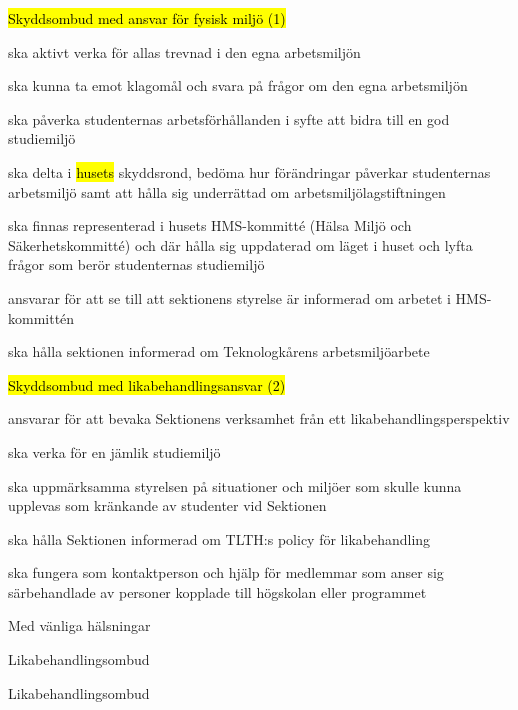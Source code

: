 \documentclass[../_main/handlingar.tex]{subfiles}
\begin{document}
\begin{attsatser}
  \hl{Skyddsombud med ansvar för fysisk miljö (1)}
  \begin{tightdashlist}
      \item ska aktivt verka för allas trevnad i den egna arbetsmiljön
      \item ska kunna ta emot klagomål och svara på frågor om den egna arbetsmiljön
      \item ska påverka studenternas arbetsförhållanden i syfte att bidra till en god studiemiljö
      \item ska delta i \hl{husets} skyddsrond, bedöma hur förändringar påverkar studenternas arbetsmiljö samt att hålla sig underrättad om arbetsmiljölagstiftningen
      \item ska finnas representerad i husets HMS-kommitté (Hälsa Miljö och Säkerhetskommitté) och där hålla sig uppdaterad om läget i huset och lyfta frågor som berör studenternas studiemiljö
      \item ansvarar för att se till att sektionens styrelse är informerad om arbetet i HMS-kommittén
      \item ska hålla sektionen informerad om Teknologkårens arbetsmiljöarbete
  \end{tightdashlist}
  \hl{Skyddsombud med likabehandlingsansvar (2)}
  \begin{tightdashlist}
      \item ansvarar för att bevaka Sektionens verksamhet från ett likabehandlingsperspektiv
      \item ska verka för en jämlik studiemiljö
      \item ska uppmärksamma styrelsen på situationer och miljöer som skulle kunna upplevas som kränkande av studenter vid Sektionen
      \item ska hålla Sektionen informerad om TLTH:s policy för likabehandling
      \item ska fungera som kontaktperson och hjälp för medlemmar som anser sig särbehandlade av personer kopplade till högskolan eller programmet
  \end{tightdashlist}
\end{attsatser}

\begin{signatures}{2}
    Med vänliga hälsningar
    \signature{Fanny Månefjord}{Likabehandlingsombud}
    \signature{Lina Samnegård}{Likabehandlingsombud}
\end{signatures}
\end{document}
